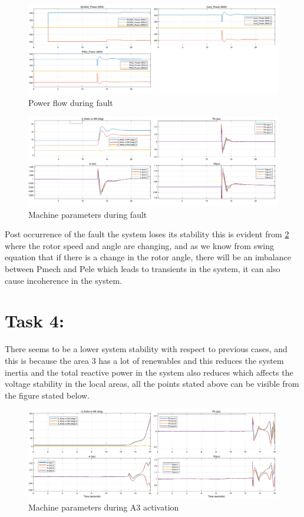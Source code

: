 \begin{figure}[H]
    \centering
        \includegraphics[width=0.8 \linewidth]{images_a4/Q2.png}
        \caption{Power flow during fault}
        \label{fig:Power flow normal}   
\end{figure}
\begin{figure}[H]
    \centering
        \includegraphics[width=0.8 \linewidth]{images_a4/Q2_m.png}
        \caption{Machine parameters during fault}
        \label{fig:machine_faultl}   
\end{figure}
Post occurrence of the fault the system loses its stability this is evident from \ref{fig:machine_faultl} where the rotor speed and angle are changing, and as we know from swing equation that if there is a change in the rotor angle, there will be an imbalance between Pmech and Pele which leads to transients in the system, it can also cause incoherence in the system.

\section*{\textbf{Task 4}:}
There seems to be a lower system stability with respect to previous cases, and this is because the area 3 has a lot of renewables and this reduces the system inertia and the total reactive power in the system also reduces which affects the voltage stability in the local areas, all the points stated above can be visible from  the figure stated below.

\begin{figure}[H]
    \centering
        \includegraphics[width=0.8 \linewidth]{images_a4/T4_m.png}
        \caption{Machine parameters during A3 activation}
        \label{fig:machine_t4}   
\end{figure}

